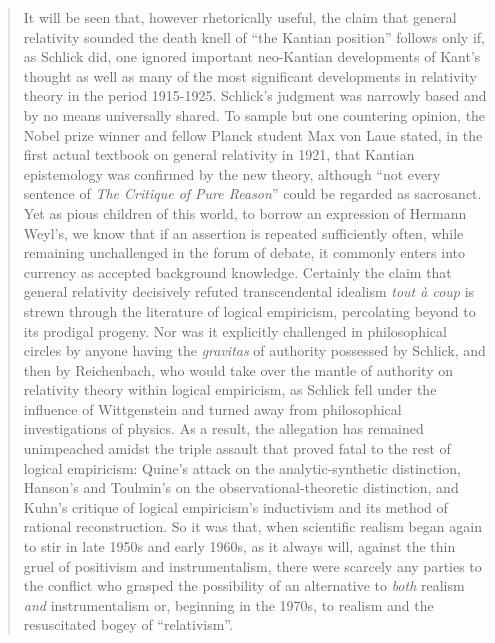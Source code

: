 \begin{quote}
    It will be seen that, however rhetorically useful, the claim that general relativity sounded the death knell of ``the Kantian position'' follows only if, as Schlick did, one ignored important neo-Kantian developments of Kant's thought as well as many of the most significant developments in relativity theory in the period 1915-1925.  Schlick's judgment was narrowly based and by no means universally shared.  To sample but one countering opinion, the Nobel prize winner and fellow Planck student Max von Laue stated, in the first actual textbook on general relativity in 1921, that Kantian epistemology was confirmed by the new theory, although ``not every sentence of \emph{The Critique of Pure Reason}'' could be regarded as sacrosanct.  Yet as pious children of this world, to borrow an expression of Hermann Weyl's, we know that if an assertion is repeated sufficiently often, while remaining unchallenged in the forum of debate, it commonly enters into currency as accepted background knowledge.  Certainly the claim that general relativity decisively refuted transcendental idealism \emph{tout \`a coup} is strewn through the literature of logical empiricism, percolating beyond to its prodigal progeny.  Nor was it explicitly challenged in philosophical circles by anyone having the \emph{gravitas} of authority possessed by Schlick, and then by Reichenbach, who would take over the mantle of authority on relativity theory within logical empiricism, as Schlick fell under the influence of Wittgenstein and turned away from philosophical investigations of physics.  As a result, the allegation has remained unimpeached amidst the triple assault that proved fatal to the rest of logical empiricism: Quine's attack on the analytic-synthetic distinction, Hanson's and Toulmin's on the observational-theoretic distinction, and Kuhn's critique of logical empiricism's inductivism and its method of rational reconstruction.  So it was that, when scientific realism began again to stir in late 1950s and early 1960s, as it always will, against the thin gruel of positivism and instrumentalism, there were scarcely any parties to the conflict who grasped the possibility of an alternative to \emph{both} realism \emph{and} instrumentalism or, beginning in the 1970s, to realism and the resuscitated bogey of ``relativism''.
    

\end{quote}
